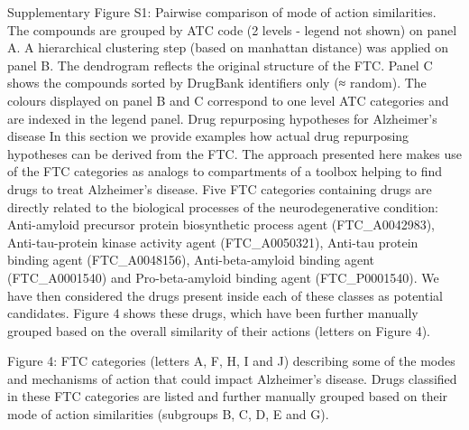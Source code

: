 \documentclass{bioinfo}
\begin{document}
Supplementary Figure S1: Pairwise comparison of mode of action similarities. The compounds are grouped 
by ATC code (2 levels - legend not shown) on panel A. A hierarchical 
clustering step (based on manhattan distance) was applied on panel B. The 
dendrogram reflects the original structure of the FTC. Panel C shows the compounds 
sorted by DrugBank identifiers only (≈ random). The colours displayed on panel B and C 
correspond to one level ATC categories and are indexed in the legend panel.
Drug repurposing hypotheses for Alzheimer’s disease
In this section we provide examples how actual drug repurposing hypotheses can be derived from the FTC. 
The approach presented here makes use of the FTC categories as analogs to compartments of a toolbox helping to 
find drugs to treat Alzheimer’s disease. Five FTC categories containing drugs are directly related to the biological 
processes of the neurodegenerative condition: Anti-amyloid precursor protein biosynthetic process agent (FTC\_A0042983), 
Anti-tau-protein kinase activity agent (FTC\_A0050321), Anti-tau protein binding agent (FTC\_A0048156), Anti-beta-amyloid 
binding agent (FTC\_A0001540) and Pro-beta-amyloid binding agent (FTC\_P0001540). We have then considered the drugs present 
inside each of these classes as potential candidates. Figure 4 shows these drugs, which have been further manually grouped 
based on the overall similarity of their actions (letters on Figure 4).
 
Figure 4: FTC categories (letters A, F, H, I and J) describing some of the modes and mechanisms of 
action that could impact Alzheimer’s disease. Drugs classified in these FTC categories are listed and further 
manually grouped based on their mode of action similarities (subgroups B, C, D, E and G).
 
\end{document}
